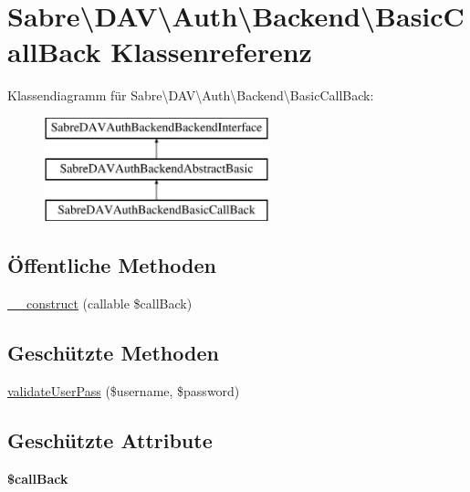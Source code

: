 \hypertarget{class_sabre_1_1_d_a_v_1_1_auth_1_1_backend_1_1_basic_call_back}{}\section{Sabre\textbackslash{}D\+AV\textbackslash{}Auth\textbackslash{}Backend\textbackslash{}Basic\+Call\+Back Klassenreferenz}
\label{class_sabre_1_1_d_a_v_1_1_auth_1_1_backend_1_1_basic_call_back}
Klassendiagramm für Sabre\textbackslash{}D\+AV\textbackslash{}Auth\textbackslash{}Backend\textbackslash{}Basic\+Call\+Back\+:\begin{figure}[H]
\begin{center}
\leavevmode
\includegraphics[height=3.000000cm]{class_sabre_1_1_d_a_v_1_1_auth_1_1_backend_1_1_basic_call_back}
\end{center}
\end{figure}
\subsection*{Öffentliche Methoden}
\begin{DoxyCompactItemize}
\item 
\mbox{\hyperlink{class_sabre_1_1_d_a_v_1_1_auth_1_1_backend_1_1_basic_call_back_ad630bf98331d3277cf33ee591b698b22}{\+\_\+\+\_\+construct}} (callable \$call\+Back)
\end{DoxyCompactItemize}
\subsection*{Geschützte Methoden}
\begin{DoxyCompactItemize}
\item 
\mbox{\hyperlink{class_sabre_1_1_d_a_v_1_1_auth_1_1_backend_1_1_basic_call_back_ad1e4a0b64809985e9bdaa8fd4f6fb871}{validate\+User\+Pass}} (\$username, \$password)
\end{DoxyCompactItemize}
\subsection*{Geschützte Attribute}
\begin{DoxyCompactItemize}
\item 
\mbox{\label{class_sabre_1_1_d_a_v_1_1_auth_1_1_backend_1_1_basic_call_back_ad8deaff08a0db131929280590ee0bf88}} 
{\bfseries \$call\+Back}
\end{DoxyCompactItemize}



